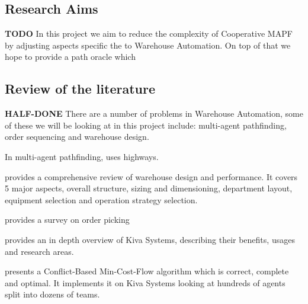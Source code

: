 \documentclass[a4paper,11pt]{article}
\begin{document}





\subsection{Research Aims}
\textbf{TODO} In this project we aim to reduce the complexity of Cooperative MAPF by adjusting aspects specific the to Warehouse Automation. On top of that we hope to provide a path oracle which 

\subsection{Review of the literature}

\textbf{HALF-DONE} There are a number of problems in Warehouse Automation, some of these we will be looking at in this project include: multi-agent pathfinding, order sequencing and warehouse design.

In multi-agent pathfinding, \cite{cohen2016bounded} uses highways.

\cite{gu2010research} provides a comprehensive review of warehouse design and performance. It covers 5 major aspects, overall structure, sizing and dimensioning, department layout, equipment selection and operation strategy selection.

\cite{de2007design} provides a survey on order picking

\cite{wurman2008coordinating} provides an in depth overview of Kiva Systems, describing their benefits, usages and research areas.




\cite{ma2016optimal} presents a Conflict-Based Min-Cost-Flow algorithm which is correct, complete and optimal. It implements it on Kiva Systems looking at hundreds of agents split into dozens of teams.
\end{document}
